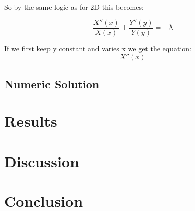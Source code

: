 \documentclass[a4paper,10pt]{article}
\begin{document}
So by the same logic as for 2D this becomes:

\begin{equation}
 \frac{X''(x)}{X(x)} + \frac{Y''(y)}{Y(y)} = -\lambda
\end{equation}

If we first keep y constant and varies x we get the equation:
\begin{equation}
 X''(x)
\end{equation}

\subsection{Numeric Solution}


\section{Results}

\section{Discussion}

\section{Conclusion}
\end{document}
